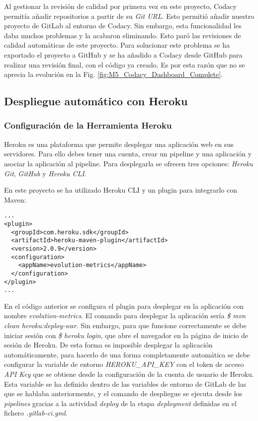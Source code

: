 Al gestionar la revisión de calidad por primera vez en este proyecto, Codacy permitía añadir repositorios a partir de su \textit{Git URL}. Esto permitió añadir nuestro proyecto de GitLab al entorno de Codacy. Sin embargo, esta funcionalidad les daba muchos problemas y la acabaron eliminando. Esto paró las revisiones de calidad automáticas de este proyecto. Para solucionar este problema se ha exportado el proyecto a GitHub y se ha añadido a Codacy desde GitHub para realizar una revisión final, con el código ya creado. Es por esta razón que no se aprecia la evolución en la Fig. \ref{fig:M5_Codacy_Dashboard_Complete}. 

\subsection{Despliegue automático con Heroku}

\subsubsection{Configuración de la Herramienta Heroku}

Heroku es una plataforma que permite desplegar una aplicación web en sus servidores. Para ello debes tener una cuenta, crear un pipeline y una aplicación y asociar la aplicación al pipeline. Para desplegarla se ofrecen tres opciones: \textit{Heroku Git}, \textit{GitHub} y \textit{Heroku CLI}.

En este proyecto se ha utilizado Heroku CLI y un plugin para integrarlo con Maven:\\
\begin{minipage}{\linewidth}
{\tiny
\begin{lstlisting}[breaklines]
...
<plugin>
  <groupId>com.heroku.sdk</groupId>
  <artifactId>heroku-maven-plugin</artifactId>
  <version>2.0.9</version>
  <configuration>
	<appName>evolution-metrics</appName>
  </configuration>
</plugin>
...
\end{lstlisting}
}
\end{minipage}

En el código anterior se configura el plugin para desplegar en la aplicación con nombre \textit{evolution-metrics}. El comando para  desplegar la aplicación sería \textit{\$ mvn clean heroku:deploy-war}. Sin embargo, para que funcione correctamente se debe iniciar sesión con \textit{\$ heroku login}, que abre el navegador en la página de inicio de sesión de Heroku. De esta forma es imposible desplegar la aplicación automáticamente, para hacerlo de una forma completamente automática se debe configurar la variable de entorno \textit{HEROKU\_API\_KEY} con el token de acceso \textit{API Key} que se obtiene desde la configuración de la cuenta de usuario de Heroku. Esta variable se ha definido dentro de las variables de entorno de GitLab de las que se hablaba anteriormente, y el comando de despliegue se ejecuta desde los \textit{pipelines} gracias a la actividad \textit{deploy} de la etapa \textit{deployment} definidas en el fichero \textit{.gitlab-ci.yml}.

